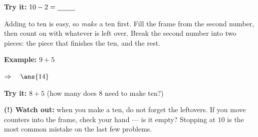 \documentclass[12pt]{article}
\begin{document}
\begin{tryitbox}
\textbf{Try it:} \quad $10 - 2 = \underline{\hspace{0.9cm}}$\\[2pt]
\end{tryitbox}


\begin{formulabox}
Adding to ten is easy, so \emph{make} a ten first. Fill the frame from the
second number, then count on with whatever is left over. Break the second
number into two pieces: the piece that finishes the ten, and the rest.
\end{formulabox}

\begin{examplebox}
\textbf{Example:} \quad $9 + 5$

$\Rightarrow\quad \ans{14}$
\end{examplebox}

\begin{tryitbox}
\textbf{Try it:} \quad $8 + 5$ \quad (how many does $8$ need to make ten?)\\[2pt]
\end{tryitbox}

\begin{watchoutbox}
\textbf{(!) Watch out:} when you make a ten, do not forget the leftovers. If
you move counters into the frame, check your hand --- is it empty? Stopping at
$10$ is the most common mistake on the last few problems.
\end{watchoutbox}
\end{document}
